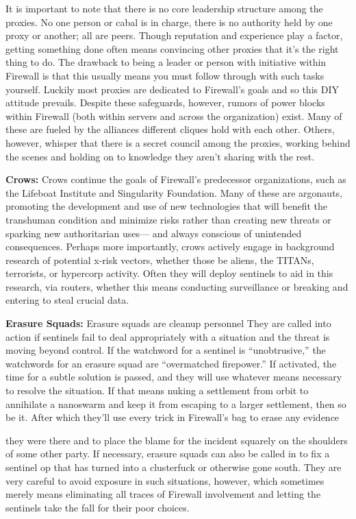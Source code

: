 It is important to note that there is no core leadership structure among the proxies. No one person or cabal is in charge, there is no authority held by one proxy or another; all are peers. Though reputation and experience play a factor, getting something done often means convincing other proxies that it's the right thing to do. The drawback to being a leader or person with initiative within Firewall is that this usually means you must follow through with such tasks yourself. Luckily most proxies are dedicated to Firewall's goals and so this DIY attitude prevails. Despite these safeguards, however, rumors of power blocks within Firewall (both within servers and across the organization) exist. Many of these are fueled by the alliances different cliques hold with each other. Others, however, whisper that there is a secret council among the proxies, working behind the scenes and holding on to knowledge they aren't sharing with the rest. 

\textbf{Crows:} Crows continue the goals of Firewall's predecessor organizations, such as the Lifeboat Institute and Singularity Foundation. Many of these are argonauts, promoting the development and use of new technologies that will benefit the transhuman condition and minimize risks rather than creating new threats or sparking new authoritarian uses— and always conscious of unintended consequences. Perhaps more importantly, crows actively engage in background research of potential x-risk vectors, whether those be aliens, the TITANs, terrorists, or hypercorp activity. Often they will deploy sentinels to aid in this research, via routers, whether this means conducting surveillance or breaking and entering to steal crucial data. 

\textbf{Erasure Squads:} Erasure squads are cleanup personnel They are called into action if sentinels fail to deal appropriately with a situation and the threat is moving beyond control. If the watchword for a sentinel is ``unobtrusive,'' the watchwords for an erasure squad are ``overmatched firepower.'' If activated, the time for a subtle solution is passed, and they will use whatever means necessary to resolve the situation. If that means nuking a settlement from orbit to annihilate a nanoswarm and keep it from escaping to a larger settlement, then so be it. After which they'll use every trick in Firewall's bag to erase any evidence 

they were there and to place the blame for the incident squarely on the shoulders of some other party. If necessary, erasure squads can also be called in to fix a sentinel op that has turned into a clusterfuck or otherwise gone south. They are very careful to avoid exposure in such situations, however, which sometimes merely means eliminating all traces of Firewall involvement and letting the sentinels take the fall for their poor choices. 

